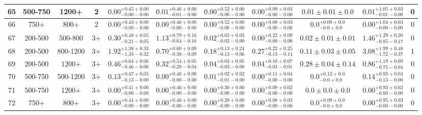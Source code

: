 \begin{table}
{\begin{tabular}{ |c|c|c|c||c|c|c|c|c||c|c| }
65 & 500-750 & 1200+ & 2 & $0.00^{+0.45+0.00}_{-0.00-0.00}$ & $0.01^{+0.46+0.00}_{-0.01-0.00}$ & $0.00^{+0.52+0.00}_{-0.00-0.00}$ & $0.00^{+0.09+0.03}_{-0.00-0.00}$ &$0.01\pm 0.01 \pm0.0$& $0.01^{+1.05+0.03}_{-0.01-0.00}$ & 0 \\ \hline
66 & 750+ & 800+ & 2 & $0.00^{+0.43+0.00}_{-0.00-0.00}$ & $0.00^{+0.46+0.00}_{-0.00-0.00}$ & $0.00^{+0.52+0.00}_{-0.00-0.00}$ & $0.00^{+0.08+0.03}_{-0.00-0.00}$ &$0.0^{+0.09+0.0}_{-0.0+0.0}$& $0.00^{+1.04+0.03}_{-0.00-0.00}$ & 0 \\ \hline
67 & 200-500 & 500-800 & 3+ & $0.30^{+0.48+0.05}_{-0.21-0.05}$ & $1.13^{+0.79+0.16}_{-0.64-0.16}$ & $0.02^{+0.03+0.03}_{-0.02-0.00}$ & $0.00^{+0.22+0.09}_{-0.00-0.00}$ &$0.02\pm 0.01 \pm0.01$& $1.46^{+1.29+0.20}_{-0.85-0.17}$ & 0 \\ \hline
68 & 200-500 & 800-1200 & 3+ & $1.92^{+1.38+0.33}_{-1.33-0.32}$ & $0.70^{+0.60+0.09}_{-0.38-0.09}$ & $0.18^{+0.13+0.24}_{-0.13-0.06}$ & $0.27^{+0.22+0.25}_{-0.13-0.14}$ &$0.11\pm 0.03 \pm0.05$& $3.08^{+1.99+0.48}_{-1.72-0.37}$ & 1 \\ \hline
69 & 200-500 & 1200+ & 3+ & $0.46^{+0.64+0.06}_{-0.46-0.00}$ & $0.32^{+0.54+0.05}_{-0.28-0.04}$ & $0.04^{+0.03+0.05}_{-0.03-0.00}$ & $0.04^{+0.10+0.07}_{-0.03-0.01}$ &$0.28\pm 0.04 \pm0.14$& $0.86^{+1.19+0.09}_{-0.75-0.04}$ & 0 \\ \hline
70 & 500-750 & 500-1200 & 3+ & $0.13^{+0.47+0.05}_{-0.13-0.00}$ & $0.00^{+0.46+0.00}_{-0.00-0.00}$ & $0.01^{+0.02+0.02}_{-0.01-0.00}$ & $0.00^{+0.11+0.04}_{-0.00-0.00}$ &$0.0^{+0.12+0.0}_{-0.0+0.0}$& $0.14^{+0.93+0.04}_{-0.13-0.00}$ & 0 \\ \hline
71 & 500-750 & 1200+ & 3+ & $0.00^{+0.41+0.00}_{-0.00-0.00}$ & $0.00^{+0.46+0.00}_{-0.00-0.00}$ & $0.00^{+0.30+0.00}_{-0.00-0.00}$ & $0.00^{+0.09+0.02}_{-0.00-0.00}$ &$0.0\pm 0.0 \pm0.0$& $0.00^{+0.93+0.02}_{-0.00-0.00}$ & 0 \\ \hline
72 & 750+ & 800+ & 3+ & $0.00^{+0.44+0.00}_{-0.00-0.00}$ & $0.00^{+0.46+0.00}_{-0.00-0.00}$ & $0.00^{+0.28+0.00}_{-0.00-0.00}$ & $0.00^{+0.08+0.03}_{-0.00-0.00}$ &$0.0^{+0.09+0.0}_{-0.0+0.0}$& $0.00^{+0.95+0.03}_{-0.00-0.00}$ & 0 \\ \hline
\end{tabular}
}
\end{table}

